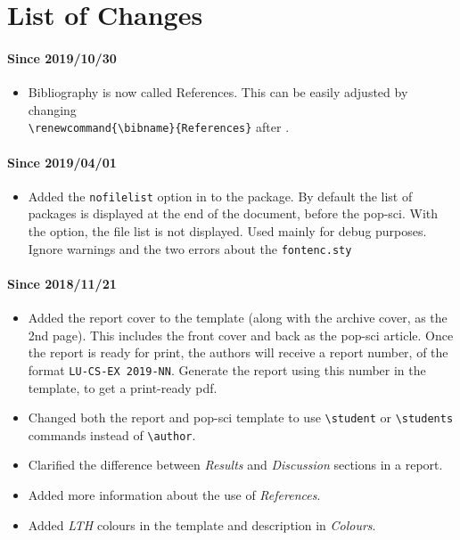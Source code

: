 \chapter{List of Changes}

\subsubsection{Since 2019/10/30}
\begin{itemize}
\item Bibliography is now called References. This can be easily adjusted by changing \\ \verb+\renewcommand{\bibname}{References}+ after \verb++.
\end{itemize}

\subsubsection{Since 2019/04/01}
\begin{itemize}
\item Added the \texttt{nofilelist} option in to the package. By default the list of packages is displayed at the end of the document, before the pop-sci. With the option, the file list is not displayed. Used mainly for debug purposes. Ignore warnings and the two errors about the \texttt{fontenc.sty}
\end{itemize}

\subsubsection{Since 2018/11/21}
\begin{itemize}
\item Added the report cover to the template (along with the archive cover, as the 2nd page). This includes the front cover and back as the pop-sci article. Once the report is ready for print, the authors will receive a report number, of the format \texttt{LU-CS-EX 2019-NN}. Generate the report using this number in the template, to get a print-ready pdf.
\item Changed both the report and pop-sci template to use \verb+\student+ or \verb+\students+ commands instead of \verb+\author+.
\item Clarified the difference between {\em Results} and {\em Discussion} sections in a report.
\item Added more information about the use of {\em References}.
\item Added {\em LTH} colours in the template and description in {\em Colours}.
\end{itemize}


